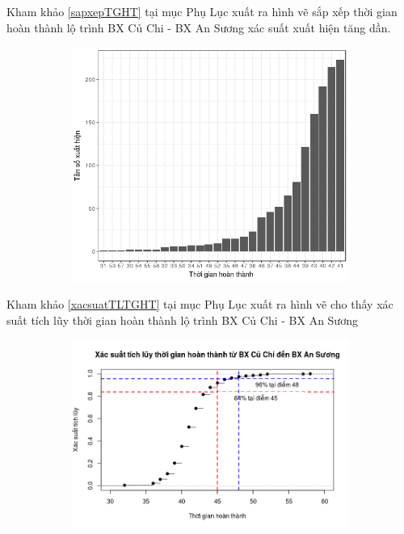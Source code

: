 \documentclass[a4paper, 13pt]{report}
\begin{document}
\FloatBarrier
Kham khảo \ref{sapxepTGHT} tại mục Phụ Lục xuất ra hình vẽ sắp xếp thời gian hoàn thành lộ trình BX Củ Chi - BX An Sương xác suất xuất hiện tăng dần.\\
\FloatBarrier
\begin{figure}[h!]
        \begin{subfigure}[b]{0.7\textwidth}
        		\label{tab:example2}
                \includegraphics[width=\linewidth]{finishTime_CC_AS_Order}
        \end{subfigure}%
\end{figure}
\FloatBarrier
Kham khảo \ref{xacsuatTLTGHT} tại mục Phụ Lục xuất ra hình vẽ cho thấy xác suất tích lũy thời gian hoàn thành lộ trình BX Củ Chi - BX An Sương \\
\FloatBarrier
\begin{figure}[h!]
        \begin{subfigure}[b]{0.7\textwidth}
        		\label{tab:example2}
                \includegraphics[width=\linewidth]{finishTime_CC_AS_ACC_Line}
        \end{subfigure}%
\end{figure}
\end{document}
